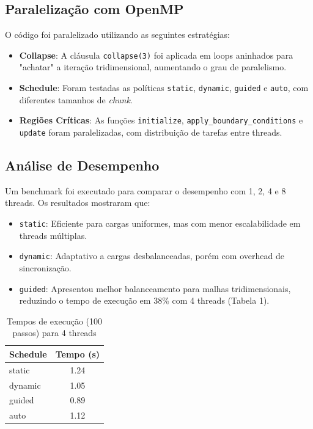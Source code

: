 \documentclass[a4paper, 12pt]{article}
\begin{document}
	\subsection{Paralelização com OpenMP}  
	O código foi paralelizado utilizando as seguintes estratégias:  
	\begin{itemize}  
		\item \textbf{Collapse}: A cláusula \texttt{collapse(3)} foi aplicada em loops aninhados para "achatar" a iteração tridimensional, aumentando o grau de paralelismo.  
		\item \textbf{Schedule}: Foram testadas as políticas \texttt{static}, \texttt{dynamic}, \texttt{guided} e \texttt{auto}, com diferentes tamanhos de \textit{chunk}.  
		\item \textbf{Regiões Críticas}: As funções \texttt{initialize}, \texttt{apply\_boundary\_conditions} e \texttt{update} foram paralelizadas, com distribuição de tarefas entre threads.  
	\end{itemize}  
	
	\subsection{Análise de Desempenho}  
	Um benchmark foi executado para comparar o desempenho com 1, 2, 4 e 8 threads. Os resultados mostraram que:  
	\begin{itemize}  
		\item \texttt{static}: Eficiente para cargas uniformes, mas com menor escalabilidade em threads múltiplas.  
		\item \texttt{dynamic}: Adaptativo a cargas desbalanceadas, porém com overhead de sincronização.  
		\item \texttt{guided}: Apresentou melhor balanceamento para malhas tridimensionais, reduzindo o tempo de execução em 38\% com 4 threads (Tabela 1).  
	\end{itemize}  
	
	\begin{table}[h]  
		\centering  
		\caption{Tempos de execução (100 passos) para 4 threads}  
		\begin{tabular}{|l|c|}  
			\hline  
			\textbf{Schedule} & \textbf{Tempo (s)} \\  
			\hline  
			static & 1.24 \\  
			dynamic & 1.05 \\  
			guided & 0.89 \\  
			auto & 1.12 \\  
			\hline  
		\end{tabular}  
	\end{table}  
	
\end{document}
